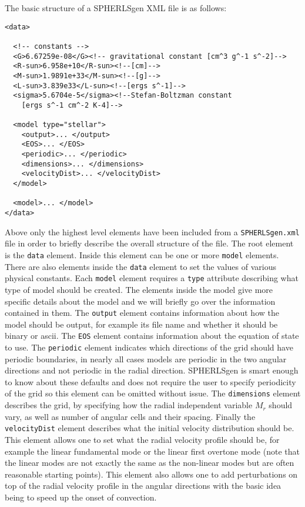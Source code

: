 \documentclass[12pt,a4paper]{book}
\begin{document}
The basic structure of a SPHERLSgen XML file is as follows:
\begin{verbatim}
<data>
  
  <!-- constants -->
  <G>6.67259e-08</G><!-- gravitational constant [cm^3 g^-1 s^-2]-->
  <R-sun>6.958e+10</R-sun><!--[cm]-->
  <M-sun>1.9891e+33</M-sun><!--[g]-->
  <L-sun>3.839e33</L-sun><!--[ergs s^-1]-->
  <sigma>5.6704e-5</sigma><!--Stefan-Boltzman constant 
    [ergs s^-1 cm^-2 K-4]-->
  
  <model type="stellar">
    <output>... </output>
    <EOS>... </EOS>
    <periodic>... </periodic>
    <dimensions>... </dimensions>
    <velocityDist>... </velocityDist>
  </model>
  
  <model>... </model>
</data>
\end{verbatim}
Above only the highest level elements have been included from a {\tt SPHERLSgen.xml} file in order to briefly describe the overall structure of the file. The root element is the {\tt data} element. Inside this element can be one or more {\tt model} elements. There are also elements inside the {\tt data} element to set the values of various physical constants. Each {\tt model} element requires a {\tt type} attribute describing what type of model should be created. The elements inside the model give more specific details about the model and we will briefly go over the information contained in them. The {\tt output} element contains information about how the model should be output, for example its file name and whether it should be binary or ascii. The {\tt EOS} element contains information about the equation of state to use. The {\tt periodic} element indicates which directions of the grid should have periodic boundaries, in nearly all cases models are periodic in the two angular directions and not periodic in the radial direction. SPHERLSgen is smart enough to know about these defaults and does not require the user to specify periodicity of the grid so this element can be omitted without issue. The {\tt dimensions} element describes the grid, by specifying how the radial independent variable $M_r$ should vary, as well as number of angular cells and their spacing. Finally the {\tt velocityDist} element describes what the initial velocity distribution should be. This element allows one to set what the radial velocity profile should be, for example the linear fundamental mode or the linear first overtone mode (note that the linear modes are not exactly the same as the non-linear modes but are often reasonable starting points). This element also allows one to add perturbations on top of the radial velocity profile in the angular directions with the basic idea being to speed up the onset of convection.
\end{document}
